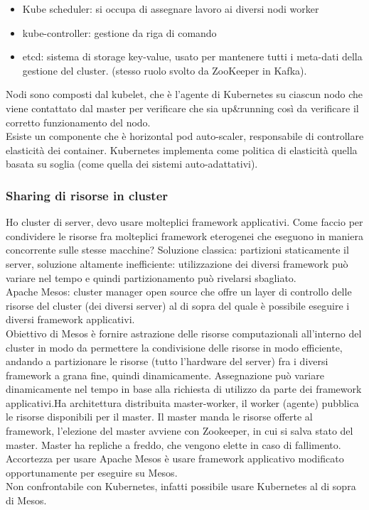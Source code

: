 \documentclass[16px]{article}
\begin{document}
\begin{itemize}
\item Kube scheduler: si occupa di assegnare lavoro ai diversi nodi worker
\item kube-controller: gestione da riga di comando
\item etcd: sistema di storage key-value, usato per mantenere tutti i meta-dati della gestione del cluster. (stesso ruolo svolto da ZooKeeper in Kafka).
\end{itemize}
Nodi sono composti dal kubelet, che è l'agente di Kubernetes su ciascun nodo che viene contattato dal master per verificare che sia up\&running così da verificare il corretto funzionamento del nodo.\\ Esiste un componente che è horizontal pod auto-scaler, responsabile di controllare elasticità dei container. Kubernetes implementa come politica di elasticità quella basata su soglia (come quella dei sistemi auto-adattativi).
\subsubsection{Sharing di risorse in cluster}
Ho cluster di server, devo usare molteplici framework applicativi. Come faccio per condividere le risorse fra molteplici framework eterogenei che eseguono in maniera concorrente sulle stesse macchine? Soluzione classica: partizioni staticamente il server, soluzione altamente inefficiente: utilizzazione dei diversi framework può variare nel tempo e quindi partizionamento può rivelarsi sbagliato.\\ Apache Mesos: cluster manager open source che offre un layer di controllo delle risorse del cluster (dei diversi server) al di sopra del quale è possibile eseguire i diversi framework applicativi.\\ Obiettivo di Mesos è fornire astrazione delle risorse computazionali all'interno del cluster in modo da permettere la condivisione delle risorse in modo efficiente, andando a partizionare le risorse (tutto l'hardware del server) fra i diversi framework a grana fine, quindi dinamicamente. Assegnazione può variare dinamicamente nel tempo in base alla richiesta di utilizzo da parte dei framework applicativi.Ha architettura distribuita master-worker, il worker (agente) pubblica le risorse disponibili per il master. Il master manda le risorse offerte al framework, l'elezione del master avviene con Zookeeper, in cui si salva stato del master. Master ha repliche a freddo, che vengono elette in caso di fallimento.\\ Accortezza per usare Apache Mesos è usare framework applicativo modificato opportunamente per eseguire su Mesos.\\ Non confrontabile con Kubernetes, infatti  possibile usare Kubernetes al di sopra di Mesos.
\end{document}
